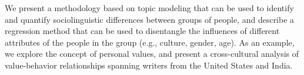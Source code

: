 We present a methodology based on topic modeling that can be used to identify and quantify sociolinguistic differences between groups of people, and describe a regression method that can be used to disentangle the influences of different attributes of the people in the group (e.g., culture, gender, age). As an example, we explore the concept of personal values, and present a cross-cultural analysis of value-behavior relationships spanning writers from the United States and India.
